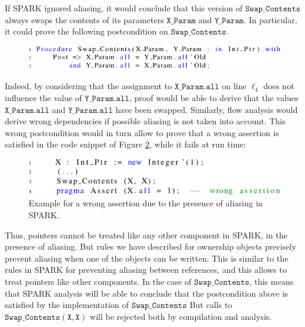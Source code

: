 \documentclass{llncs}
\newcommand\var[1]{\ensuremath{\mathtt{#1}}}
\begin{document}
If SPARK ignored aliasing, it would conclude that this version of \var{Swap\_Contents} always swaps the contents of its parameters \var{X\_Param} and \var{Y\_Param}.
In particular, it could prove the following postcondition on \var{Swap\_Contents}.

\begin{figure}[htb!]
\centering
  \captionsetup{justification=centering,margin=0.6cm}
   \includegraphics[]{spark_ex1_proof}
   \label{fig:spark_ex1_proof}
\end{figure}

Indeed, by considering that the assignment to \var{X\_Param.all} on line $\ell_4$ does not influence the value of \var{Y\_Param.all}, proof would be able to
derive that the values \var{X\_Param.all} and \var{Y\_Param.all} have been swapped. Similarly, flow analysis would derive wrong dependencies if possible aliasing is not taken into account.
This wrong postcondition would in turn allow to prove that a wrong assertion is satisfied in the code snippet of Figure \ref{fig:spark_ex1_exp}, while it fails at run time:

\begin{figure}[htb!]
\centering
  \captionsetup{justification=centering,margin=0.6cm}
   \includegraphics[]{spark_ex1_exp}
	\caption{Example for a wrong assertion due to the presence of aliasing in SPARK.}
   \label{fig:spark_ex1_exp}
\end{figure}

Thus, pointers cannot be treated like any other component in SPARK, in the presence of aliasing. But rules we have described for ownership objects precisely prevent
aliasing when one of the objects can be written. This is similar to the rules in SPARK for preventing aliasing between references, and this allows to treat pointers
like other components.
In the case of \var{Swap\_Contents}, this means that SPARK analysis will be able to conclude that the postcondition above is satisfied by the implementation of \var{Swap\_Contents}
But calls to \var{Swap\_Contents(X,X)} will be rejected both by compilation and analysis.
\end{document}
